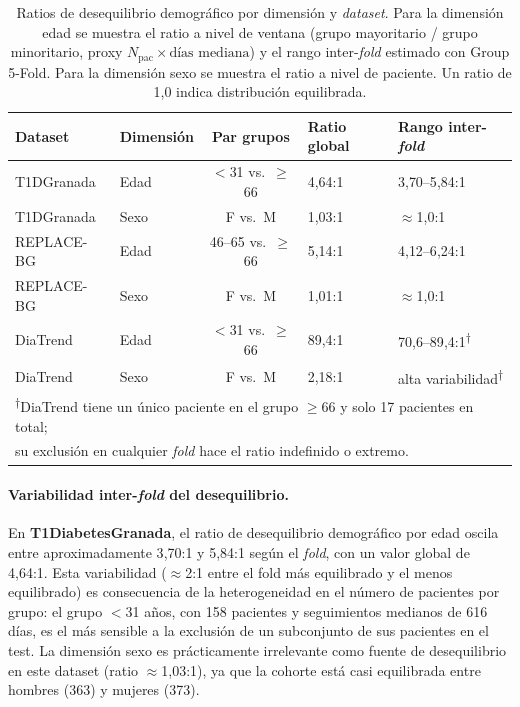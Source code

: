 \begin{table}[H]
\centering
\caption{Ratios de desequilibrio demográfico por dimensión y \textit{dataset}. Para la dimensión edad se muestra el ratio a nivel de ventana (grupo mayoritario / grupo minoritario, proxy $N_\text{pac} \times \text{días mediana}$) y el rango inter-\textit{fold} estimado con Group 5-Fold. Para la dimensión sexo se muestra el ratio a nivel de paciente. Un ratio de 1{,}0 indica distribución equilibrada.}
\label{tab:imbalance_by_fold}
\setlength{\tabcolsep}{6pt}
\begin{tabular}{llcll}
\hline
\textbf{Dataset} & \textbf{Dimensión} & \textbf{Par grupos} & \textbf{Ratio global} & \textbf{Rango inter-\textit{fold}} \\
\hline
T1DGranada  & Edad & $<$31 vs.\ $\geq$66 & 4{,}64:1 & 3{,}70–5{,}84:1 \\
T1DGranada  & Sexo & F vs.\ M            & 1{,}03:1 & ${\approx}$1{,}0:1 \\
\hline
REPLACE-BG  & Edad & 46–65 vs.\ $\geq$66 & 5{,}14:1 & 4{,}12–6{,}24:1 \\
REPLACE-BG  & Sexo & F vs.\ M            & 1{,}01:1 & ${\approx}$1{,}0:1 \\
\hline
DiaTrend    & Edad & $<$31 vs.\ $\geq$66 & 89{,}4:1 & 70{,}6–89{,}4:1\textsuperscript{†} \\
DiaTrend    & Sexo & F vs.\ M            & 2{,}18:1 & alta variabilidad\textsuperscript{†} \\
\hline
\multicolumn{5}{l}{\footnotesize \textsuperscript{†}DiaTrend tiene un único paciente en el grupo $\geq$66 y solo 17 pacientes en total;}\\
\multicolumn{5}{l}{\footnotesize su exclusión en cualquier \textit{fold} hace el ratio indefinido o extremo.}\\
\end{tabular}
\end{table}

\paragraph{Variabilidad inter-\textit{fold} del desequilibrio.}
En \textbf{T1DiabetesGranada}, el ratio de desequilibrio demográfico por edad oscila entre aproximadamente 3{,}70:1 y 5{,}84:1 según el \textit{fold}, con un valor global de 4{,}64:1. Esta variabilidad (${\approx}$2:1 entre el fold más equilibrado y el menos equilibrado) es consecuencia de la heterogeneidad en el número de pacientes por grupo: el grupo $<$31 años, con 158 pacientes y seguimientos medianos de 616 días, es el más sensible a la exclusión de un subconjunto de sus pacientes en el test. La dimensión sexo es prácticamente irrelevante como fuente de desequilibrio en este dataset (ratio ${\approx}$1{,}03:1), ya que la cohorte está casi equilibrada entre hombres (363) y mujeres (373).

